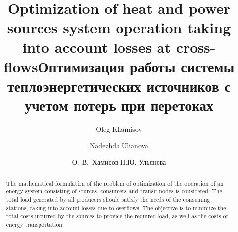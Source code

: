 \begin{englishtitle}
\title{Optimization of heat and power sources system operation taking into account losses at cross-flows}
\author{Oleg Khamisov \and Nadezhda Ulianova}

\maketitle

\begin{abstract}
The mathematical formulation of the problem of optimization of the operation of an energy system consisting of sources, consumers and transit nodes is considered. The total load generated by all producers should satisfy the needs of the consuming stations, taking into account losses due to overflows. The objective is to minimize the total costs incurred by the sources to provide the required load, as well as the costs of energy transportation.

\end{abstract}
\end{englishtitle}

\iffalse
\documentclass[12pt]{llncs}
\usepackage[T2A]{fontenc}
\usepackage[utf8]{inputenc}
\usepackage[english,russian]{babel}
\usepackage[russian]{nla}




\fi

\title{Оптимизация работы системы теплоэнергетических источников с учетом потерь при перетоках}

 \author{ О.~В.~Хамисов  %
Н.Ю. Ульянова %
} 

\maketitle

